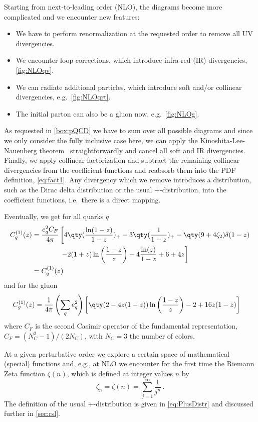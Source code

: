 Starting from next-to-leading order (NLO), the diagrams become more complicated and we encounter new features:
\begin{itemize}
    \item We have to perform renormalization at the requested order to remove all UV divergencies.
    \item We encounter loop corrections, which introduce infra-red (IR) divergencies, \cref{fig:NLOqv}.
    \item We can radiate additional particles, which introduce soft and/or collinear divergencies, e.g.\ \cref{fig:NLOqrt}.
    \item The initial parton can also be a gluon now, e.g.\ \cref{fig:NLOg}.
\end{itemize}
As requested in \cref{box:pQCD} we have to sum over all possible diagrams and since we only consider the fully inclusive case here, we can apply the Kinoshita-Lee-Nauenberg theorem~\cite{Bloch:1937pw,Kinoshita:1962ur,Lee:1964is} straightforwardly and cancel all soft and IR divergencies.
Finally, we apply collinear factorization and subtract the remaining collinear divergencies from the coefficient functions and reabsorb them into the PDF definition, \cref{eq:fact1}.
Any divergency which we remove introduces a distribution, such as the Dirac delta distribution or the usual +-distribution, into the coefficient functions, i.e.\ there is a direct mapping.

Eventually, we get for all quarks $q$
\begin{align}
    C_q^{(1)}(z) &= \frac{e_q^2 C_F}{4\pi} \left[ 4 \qty(\frac{\ln(1-z)}{1-z})_+ - 3 \qty(\frac{1}{1-z})_+ - \qty(9+4\zeta_2)\delta(1-z)\right. \nonumber\\
    & \hspace{40pt} \left. - 2(1+z)\ln\left(\frac{1-z}{z}\right) - 4 \frac{\ln(z)}{1-z} + 6 + 4z\right] \label{eq:NLOCq}\\
     &= C_{\bar q}^{(1)}(z)
\end{align}
and for the gluon
\begin{align}
    C_g^{(1)}(z) &=\frac 1 {4\pi} \left(\sum_q e_q^2\right) \left[ \qty(2 - 4 z (1 - z)) \ln\left(\frac{1 - z} z\right)  - 2 + 16 z (1 - z)  \right] \label{eq:NLOCg}
\end{align}
where $C_F$ is the second Casimir operator of the fundamental representation, $C_F = (N_C^2 - 1)/(2 N_C)$, with $N_C=3$ the number of colors.

At a given perturbative order we explore a certain space of mathematical (special) functions and, e.g., at NLO we encounter for the first time the Riemann Zeta function $\zeta(n)$, which is defined at integer values $n$ by
\begin{equation}
    \zeta_n = \zeta(n) = \sum\limits_{j=1}^\infty \frac 1 {j^n}\,.
\end{equation}
The definition of the usual +-distribution is given in \cref{eq:PlusDistr} and discussed further in \cref{sec:rsl}.
